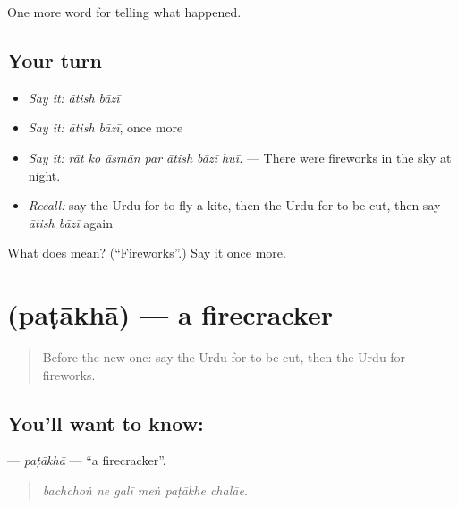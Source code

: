 \begin{grammarlens}[title={What you've built}]
One more word for telling what happened.
\end{grammarlens}

\subsection*{Your turn}
\begin{itemize}
\raggedright
  \item \emph{Say it:} \emph{ātish bāzī}
  \item \emph{Say it:} \emph{ātish bāzī}, once more
  \item \emph{Say it:} \emph{rāt ko āsmān par ātish bāzī huī.} — There were fireworks in the sky at night.
  \item \emph{Recall:} say the Urdu for to fly a kite, then the Urdu for to be cut, then say \emph{ātish bāzī} again
\end{itemize}

\begin{tcolorbox}[breakable,colback=teal!4,colframe=teal!35!black,title={Before you move on}]
What does   mean? (\textquotedblleft{}Fireworks\textquotedblright{}.) Say it once more.
\end{tcolorbox}
\section[\texorpdfstring{\ur{پٹاخا} (paṭākhā)}{پٹاخا (paṭākhā)}]{ (paṭākhā) — a firecracker}

\label{lesson:UR-C320-patakha}



\begin{quote}
Before the new one: say the Urdu for to be cut, then the Urdu for fireworks.
\end{quote}

\subsection*{You'll want to know: }
\textbf{} — \emph{paṭākhā} — \textquotedblleft{}a firecracker\textquotedblright{}.

\begin{quote}
     
\end{quote}

\begin{quote}
\emph{bachchoṅ ne galī meṅ paṭākhe chalāe.}
\end{quote}

